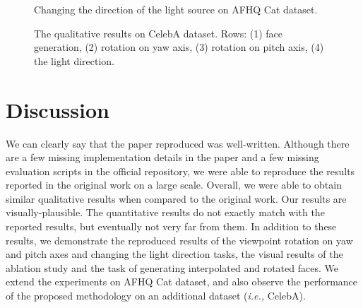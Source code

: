 \begin{figure}[h!]%
    \centering
    \qquad
    \caption{Changing the direction of the light source on AFHQ Cat dataset.}%
    \label{fig:afhq_light}%
\end{figure}

\begin{figure}[t!]
    \centering
    \caption{The qualitative results on CelebA dataset. Rows: (1) face generation, (2) rotation on yaw axis, (3) rotation on pitch axis, (4) the light direction.}
    \label{fig:celeba_results}
\end{figure}


\section{Discussion}

We can clearly say that the paper reproduced was well-written. Although there are a few missing implementation details in the paper and a few missing evaluation scripts in the official repository, we were able to reproduce the results reported in the original work on a large scale. 
Overall, we were able to obtain similar qualitative results when compared to the original work. Our results are visually-plausible. The quantitative results do not exactly match with the reported results, but eventually not very far from them. In addition to these results, we demonstrate the reproduced results of the viewpoint rotation on yaw and pitch axes and changing the light direction tasks, the visual results of the ablation study and the task of generating interpolated and rotated faces. We extend the experiments on AFHQ Cat dataset, and also observe the performance of the proposed methodology on an additional dataset (\textit{i.e.,} CelebA).

